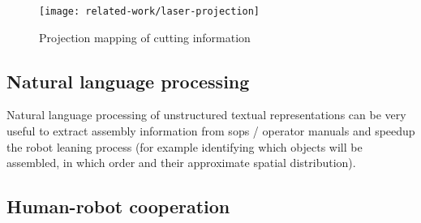 \begin{figure}[H]
	\centering
	\texttt{[image: related-work/laser-projection]}
	\caption[Projection mapping of cutting information]{Projection mapping of cutting information\protect\footnotemark}
	\label{fig:laser-projection}
\end{figure}

%


\subsection{Natural language processing}

Natural language processing of unstructured textual representations can be very useful to extract assembly information from \glspl{sop} / operator manuals \cite{Stenmark2014,Stenmark2013} and speedup the robot leaning process \cite{Tenorth2010} (for example identifying which objects will be assembled, in which order and their approximate spatial distribution).



\subsection{Human-robot cooperation}

